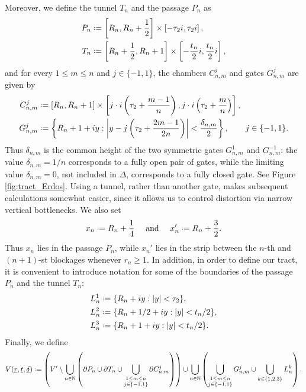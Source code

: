 \documentclass[a4paper, 11pt, reqno]{amsart}
\numberwithin{equation}{section}
\theoremstyle{plain}
\newcommand*{\defeq}{\mathrel{\vcenter{\baselineskip0.5ex \lineskiplimit0pt
 \hbox{\scriptsize.}\hbox{\scriptsize.}}}=}
\theoremstyle{remark}
\newcommand{\N}{{\mathbb{N}}}
\newcommand{\uldelta}{\underline{\delta}}
\newcommand{\ulr}{\underline{r}}
\newcommand{\ult}{\underline{t}}
\begin{document}
Moreover, we define the tunnel $T_n$ and the passage $P_n$ as 
\begin{align*}
	P_n & \defeq \left[R_n, R_n+\frac{1}{2}\right]\times \left[-\tau_2 i,\tau_2 i\right], \\
	T_n &\defeq \left[R_n+\frac{1}{2}, R_n+1\right]\times \left[-\frac{t_n}{2}i,\frac{t_n}{2}i\right], 
\end{align*}
and for every $1\leq m\leq n$ and $j\in \{-1,1\}$, the chambers $C^{j}_{n,m}$ and gates $G^{j}_{n,m}$ are given by
\begin{align*}
	C^{j}_{n,m} & \defeq \left[R_n, R_n+1\right]\times \left[j\cdot i\left(\tau_2+\frac{m-1}{n}\right), j\cdot i\left(\tau_2+\frac{m}{n}\right)\right], \\
	G^j_{n,m}
	& \defeq
	\left\{R_n+1+iy:
	\left|y-j\left(\tau_2+\frac{2m-1}{2n}\right)\right|<\frac{\delta_{n,m}}2
	\right\},
	\qquad j\in\{-1,1\}.
\end{align*}
Thus \(\delta_{n,m}\) is the common height of the two symmetric gates \(G^1_{n,m}\) and \(G^{-1}_{n,m}\): the value
\(\delta_{n,m}=1/n\) corresponds to a fully open pair of gates, while the limiting value \(\delta_{n,m}=0\), not included
in \(\Delta\), corresponds to a fully closed gate. See Figure \ref{fig:tract_Erdos}. Using a tunnel, rather than another gate, makes subsequent calculations somewhat easier, since it allows us to control distortion via narrow vertical bottlenecks.
We also set 
	$$x_n\defeq R_n+\frac14 \quad \text{ and } \quad x_n'\defeq R_n+\frac32.$$ 
	Thus \(x_n\) lies in the passage \(P_n\), while \(x_n'\) lies in the strip between the \(n\)-th and \((n+1)\)-st blockages whenever \(r_n\ge1\).
In addition, in order to define our tract, it is convenient to introduce notation for some of the boundaries of the passage \(P_n\) and the tunnel \(T_n\): 
\begin{align*}
	L^1_n&\defeq\{R_n+iy:|y|<\tau_2\},\\
	L^2_n&\defeq\{R_n+1/2+iy:|y|<t_n/2\},\\
	L^3_n&\defeq\{R_n+1+iy:|y|<t_n/2\}.
\end{align*}
Finally, we define 
\begin{equation*}
	V(\ulr,\ult,\uldelta)\defeq
	\left(
	V'\setminus
	\bigcup_{n\in\N}
	\left(
	\partial P_n\cup \partial T_n
	\cup
	\bigcup_{\substack{1\le m\le n\\ j\in\{-1,1\}}}
	\partial C^j_{n,m}
	\right)
	\right)
	\cup
	\bigcup_{n\in\N}
	\left(
	\bigcup_{\substack{1\le m\le n\\ j\in\{-1,1\}}} G^j_{n,m}
	\cup
	\bigcup_{k\in\{1,2,3\}} L^k_n
	\right).
\end{equation*}
\end{document}
